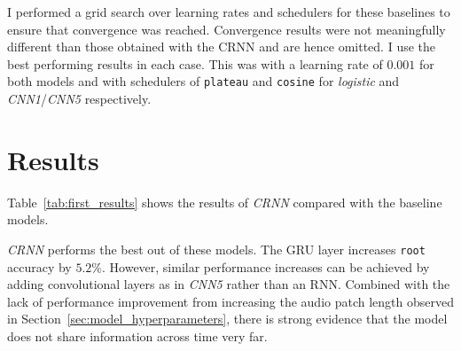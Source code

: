 I performed a grid search over learning rates and schedulers for these baselines to ensure that convergence was reached. Convergence results were not meaningfully different than those obtained with the CRNN and are hence omitted. I use the best performing results in each case. This was with a learning rate of $0.001$ for both models and with schedulers of \texttt{plateau} and \texttt{cosine} for \emph{logistic} and \emph{CNN1}/\emph{CNN5} respectively.



\section{Results}

Table~\ref{tab:first_results} shows the results of \emph{CRNN} compared with the baseline models.

\emph{CRNN} performs the best out of these models. The GRU layer increases \texttt{root} accuracy by $5.2\%$. However, similar performance increases can be achieved by adding convolutional layers as in \emph{CNN5} rather than an RNN. Combined with the lack of performance improvement from increasing the audio patch length observed in Section~\ref{sec:model_hyperparameters}, there is strong evidence that the model does not share information across time very far.


